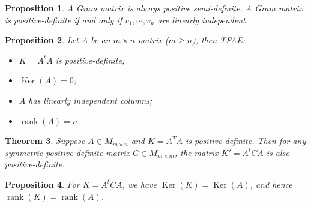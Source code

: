 \documentclass[12pt]{amsart}
\DeclareMathOperator{\rank}{rank}
\renewcommand{\geq}{\geqslant}
\DeclareMathOperator{\Ker}{Ker}
\newtheorem{theorem}{Theorem}[section]
\newtheorem{proposition}[theorem]{Proposition}
\theoremstyle{remark}
\numberwithin{equation}{section}
\begin{document}
	\begin{proposition}
		A Gram matrix is always positive semi-definite. A Gram matrix is positive-definite if and only if $v_1,\cdots,v_n$ are linearly independent.
	\end{proposition}
	\begin{proposition}
		Let $A$ be an $m\times n$ matrix ($m\geq n$), then TFAE:
	\begin{itemize}
		\item $K=A^tA$ is positive-definite;
		\item $\Ker(A)=0$;
		\item $A$ has linearly independent columns;
		\item $\rank(A)=n$.
	\end{itemize}
	\end{proposition}
	\begin{theorem}
		Suppose $A\in M_{m\times n}$ and $K=A^TA$ is positive-definite. Then for any symmetric positive definite matrix $C\in M_{m\times m}$, the matrix $K'=A^tCA$ is also positive-definite.
	\end{theorem}
	\begin{proposition}
		For $K=A^tCA$, we have $\Ker (K)=\Ker(A)$, and hence $\rank(K)=\rank(A)$.
	\end{proposition}
	
\end{document}
